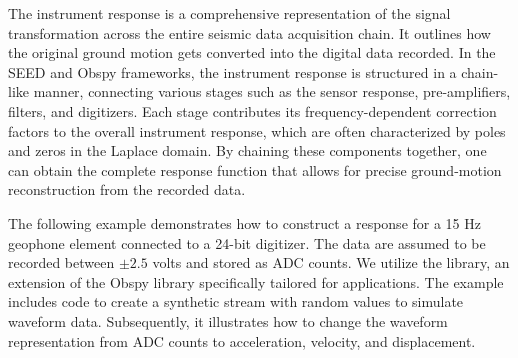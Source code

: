 \label{sec:app_response}

The instrument response is a comprehensive representation of the signal transformation across the entire seismic data acquisition chain. It outlines how the original ground motion gets converted into the digital data recorded. In the SEED and Obspy frameworks, the instrument response is structured in a chain-like manner, connecting various stages such as the sensor response, pre-amplifiers, filters, and digitizers. Each stage contributes its frequency-dependent correction factors to the overall instrument response, which are often characterized by poles and zeros in the Laplace domain. By chaining these components together, one can obtain the complete response function that allows for precise ground-motion reconstruction from the recorded data.

The following example demonstrates how to construct a response for a 15 Hz geophone element connected to a 24-bit digitizer. The data are assumed to be recorded between \( \pm 2.5 \) volts and stored as ADC counts. We utilize the \muquake library, an extension of the Obspy library specifically tailored for \museismic applications. The example includes code to create a synthetic stream with random values to simulate waveform data. Subsequently, it illustrates how to change the waveform representation from ADC counts to acceleration, velocity, and displacement.



